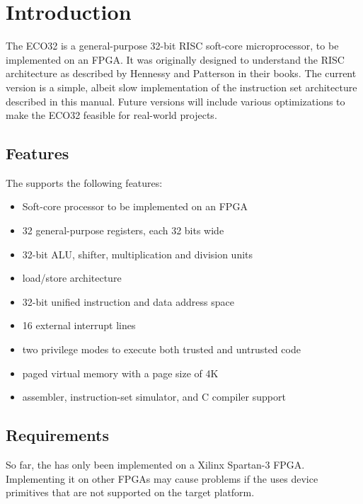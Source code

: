 \chapter{Introduction}
The ECO32 is a general-purpose 32-bit RISC soft-core microprocessor, to be
implemented on an FPGA. It was originally designed to understand the RISC
architecture as described by Hennessy and Patterson in their books. The
current version is a simple, albeit slow implementation of the instruction
set architecture described in this manual. Future versions will include
various optimizations to make the ECO32 feasible for real-world projects.

\section{Features}
The \eco supports the following features:
\begin{itemize}
\item Soft-core processor to be implemented on an FPGA
\item 32 general-purpose registers, each 32 bits wide
\item 32-bit ALU, shifter, multiplication and division units
\item load/store architecture
\item 32-bit unified instruction and data address space
\item 16 external interrupt lines
\item two privilege modes to execute both trusted and untrusted code
\item paged virtual memory with a page size of 4K
\item assembler, instruction-set simulator, and C compiler support
\end{itemize}

\section{Requirements}
So far, the \eco has only been implemented on a Xilinx Spartan-3 FPGA. Implementing it on other FPGAs may cause problems if the \eco uses device primitives that are not supported on the target platform.
